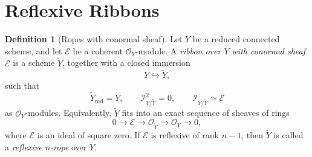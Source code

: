 \documentclass[11pt,twoside]{amsart}
\theoremstyle{plain}
\numberwithin{equation}{section}
\theoremstyle{definition}
\newtheorem{definition}[theorem]{Definition}
\begin{document}
\section{Reflexive Ribbons}

\begin{definition}[Ropes with conormal sheaf]
\label{def:ribbon-conormal-sheaf}
Let \(Y\) be a reduced connected scheme, and let \(\mathcal E\) be a coherent
\(\mathcal O_Y\)-module. A \emph{ribbon over \(Y\)
with conormal sheaf \(\mathcal E\)} is a scheme \(\widetilde Y\), together with a closed
immersion
\[
    Y\hookrightarrow \widetilde Y,
\]
such that
\[
    \widetilde Y_{\mathrm{red}}=Y,
    \qquad
    \mathcal I_{Y/\widetilde Y}^{2}=0,
    \qquad
    \mathcal I_{Y/\widetilde Y}\simeq \mathcal E
\]
as \(\mathcal O_Y\)-modules. Equivalently, \(\widetilde Y\) fits into an exact sequence of sheaves of rings
\[
    0\longrightarrow \mathcal E
    \longrightarrow \mathcal O_{\widetilde Y}
    \longrightarrow \mathcal O_Y
    \longrightarrow 0,
\]
where \(\mathcal E\) is an ideal of square zero. If \(\mathcal E\) is reflexive of rank \(n-1\), then $\widetilde{Y}$ is called a \emph{reflexive \(n\)-rope} over \(Y\).
\end{definition}
\end{document}
